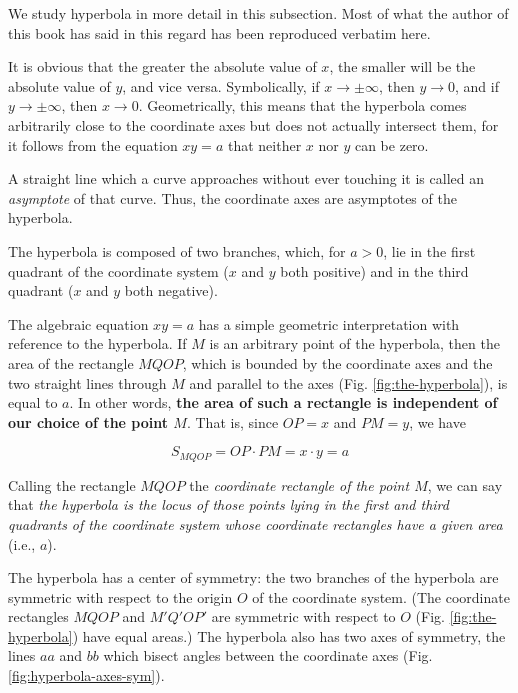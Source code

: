 \documentclass[11pt]{article}
\theoremstyle{definition}
\theoremstyle{plain}
\theoremstyle{problemstyle}
\theoremstyle{remark}
\theoremstyle{definition}
\begin{document}
We study hyperbola in more detail in this subsection. Most of what the author of this book has said in this regard has been reproduced verbatim here.

It is obvious that the greater the absolute value of $x$, the smaller will be the absolute value of $y$, and vice versa. Symbolically, if $x\to\pm\infty$, then $y\to0$, and if $y\to\pm\infty$, then $x\to0$. Geometrically, this means that the hyperbola comes arbitrarily close to the coordinate axes but does not actually intersect them, for it follows from the equation $xy=a$ that neither $x$ nor $y$ can be zero.

A straight line which a curve approaches without ever touching it is called an \emph{asymptote} of that curve. Thus, the coordinate axes are asymptotes of the hyperbola.

The hyperbola is composed of two branches, which, for $a>0$, lie in the first quadrant of the coordinate system ($x$ and $y$ both positive) and in the third quadrant ($x$ and $y$ both negative).

The algebraic equation $xy=a$ has a simple geometric interpretation with reference to the hyperbola. If $M$ is an arbitrary point of the hyperbola, then the area of the rectangle $MQOP$, which is bounded by the coordinate axes and the two straight lines through $M$ and parallel to the axes (Fig. \ref{fig:the-hyperbola}), is equal to $a$. In other words, \textbf{the area of such a rectangle is independent of our choice of the point $M$}. That is, since $OP=x$ and $PM=y$, we have

\begin{equation}
\label{eq:area-of-coordinate-rect}
    S_{MQOP}=OP\cdot PM=x\cdot y=a
\end{equation}

Calling the rectangle $MQOP$ the \emph{coordinate rectangle of the point $M$}, we can say that \emph{the hyperbola is the locus of those points lying in the first and third quadrants of the coordinate system whose coordinate rectangles have a given area} (i.e., $a$).

The hyperbola has a center of symmetry: the two branches of the hyperbola are symmetric with respect to the origin $O$ of the coordinate system. (The coordinate rectangles $MQOP$ and $M'Q'OP'$ are symmetric with respect to $O$ (Fig. \ref{fig:the-hyperbola}) have equal areas.) The hyperbola also has two axes of symmetry, the lines $aa$ and $bb$ which bisect angles between the coordinate axes (Fig. \ref{fig:hyperbola-axes-sym}). 
\end{document}
